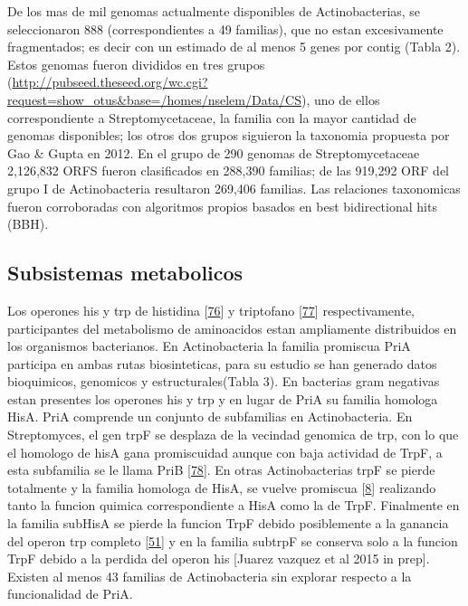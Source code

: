 \documentclass[12pt,twoside]{reedthesis}
\begin{document}
  De los mas de mil genomas actualmente disponibles de Actinobacterias, se
  seleccionaron 888 (correspondientes a 49 familias), que no estan
  excesivamente fragmentados; es decir con un estimado de al menos 5 genes
  por contig (Tabla 2). Estos genomas fueron divididos en tres grupos
  (\url{http://pubseed.theseed.org/wc.cgi?request=show_otus\&base=/homes/nselem/Data/CS}),
  uno de ellos correspondiente a Streptomycetaceae, la familia con la
  mayor cantidad de genomas disponibles; los otros dos grupos siguieron la
  taxonomia propuesta por Gao \& Gupta en 2012. En el grupo de 290 genomas
  de Streptomycetaceae 2,126,832 ORFS fueron clasificados en 288,390
  familias; de las 919,292 ORF del grupo I de Actinobacteria resultaron
  269,406 familias. Las relaciones taxonomicas fueron corroboradas con
  algoritmos propios basados en best bidirectional hits (BBH).
  
  \subsection{Subsistemas metabolicos}\label{subsistemas-metabolicos}
  
  Los operones his y trp de histidina
  {[}\protect\hyperlink{ref-fondiux5fevolutionux5f2009}{76}{]} y
  triptofano {[}\protect\hyperlink{ref-merinoux5fevolutionux5f2008}{77}{]}
  respectivamente, participantes del metabolismo de aminoacidos estan
  ampliamente distribuidos en los organismos bacterianos. En
  Actinobacteria la familia promiscua PriA participa en ambas rutas
  biosinteticas, para su estudio se han generado datos bioquimicos,
  genomicos y estructurales(Tabla 3). En bacterias gram negativas estan
  presentes los operones his y trp y en lugar de PriA su familia homologa
  HisA. PriA comprende un conjunto de subfamilias en Actinobacteria. En
  Streptomyces, el gen trpF se desplaza de la vecindad genomica de trp,
  con lo que el homologo de hisA gana promiscuidad aunque con baja
  actividad de TrpF, a esta subfamilia se le llama PriB
  {[}\protect\hyperlink{ref-verduzco-castroux5fco-occurrenceux5f2016}{78}{]}.
  En otras Actinobacterias trpF se pierde totalmente y la familia homologa
  de HisA, se vuelve promiscua
  {[}\protect\hyperlink{ref-baronagomezux5foccurrenceux5f2003}{8}{]}
  realizando tanto la funcion quimica correspondiente a HisA como la de
  TrpF. Finalmente en la familia subHisA se pierde la funcion TrpF debido
  posiblemente a la ganancia del operon trp completo
  {[}\protect\hyperlink{ref-noda-garciaux5fevolutionux5f2013}{51}{]} y en
  la familia subtrpF se conserva solo a la funcion TrpF debido a la
  perdida del operon his {[}Juarez vazquez et al 2015 in prep{]}. Existen
  al menos 43 familias de Actinobacteria sin explorar respecto a la
  funcionalidad de PriA.
  
\end{document}
